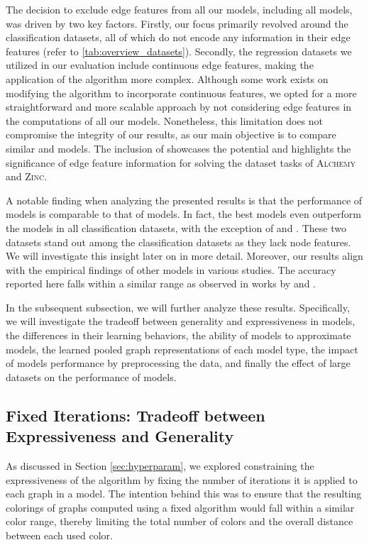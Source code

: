 The decision to exclude edge features from all our models, including all \wlnn models, was driven by two key factors. Firstly, our focus primarily revolved around the classification datasets, all of which do not encode any information in their edge features (refer to \cref{tab:overview_datasets}). Secondly, the regression datasets we utilized in our evaluation include continuous edge features, making the application of the \wl algorithm more complex. Although some work exists on modifying the \wl algorithm to incorporate continuous features, we opted for a more straightforward and more scalable approach by not considering edge features in the computations of all our models. Nonetheless, this limitation does not compromise the integrity of our results, as our main objective is to compare similar \gnn and \wlnn models. The inclusion of \gineeps showcases the potential and highlights the significance of edge feature information for solving the dataset tasks of \textsc{Alchemy} and \textsc{Zinc}.

A notable finding when analyzing the presented results is that the performance of \wlnn models is comparable to that of \gnn models. In fact, the best \wlnn models even outperform the \gnn models in all classification datasets, with the exception of \imdb and \reddit. These two datasets stand out among the classification datasets as they lack node features. We will investigate this insight later on in more detail. 
Moreover, our results align with the empirical findings of other \gnn models in various studies. The accuracy reported here falls within a similar range as observed in works by \cite{Xu2018,Morris2022,Mor+2020} and \cite{Zhang2018}. 

In the subsequent subsection, we will further analyze these results. Specifically, we will investigate the tradeoff between generality and expressiveness in \wlnn models, the differences in their learning behaviors, the ability of \gnn models to approximate \wlnn models, the learned pooled graph representations of each model type, the impact of \gnn models performance by preprocessing the data, and finally the effect of large datasets on the performance of \wlnn models.

\subsection{Fixed \wl Iterations: Tradeoff between Expressiveness and Generality}
As discussed in Section \ref{sec:hyperparam}, we explored constraining the expressiveness of the \wl algorithm by fixing the number of iterations it is applied to each graph in a \wlnn model. The intention behind this was to ensure that the resulting colorings of graphs computed using a fixed \wl algorithm would fall within a similar color range, thereby limiting the total number of colors and the overall distance between each used color.

